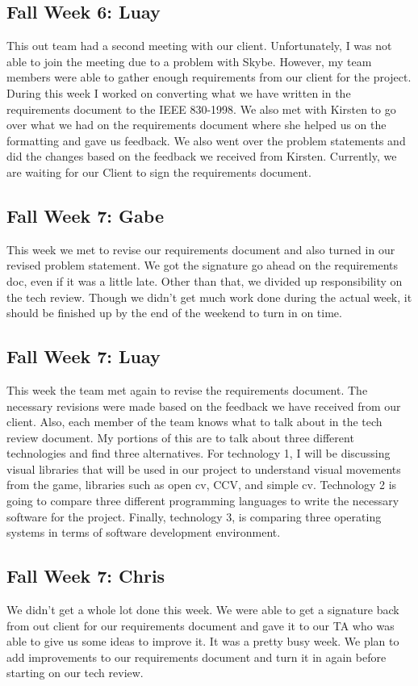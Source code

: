 \documentclass[onecolumn, draftclsnofoot,10pt, compsoc]{IEEEtran}
\begin{document}
\subsection{Fall Week 6: Luay}
This out team had a second meeting with our client. Unfortunately, I was not able to join the meeting due to a problem with Skybe. However, my team members were able to gather enough requirements from our client for the project. During this week I worked on converting what we have written in the requirements document to the IEEE 830-1998. We also met with Kirsten to go over what we had on the requirements document where she helped us on the formatting and gave us feedback. We also went over the problem statements and did the changes based on the feedback we received from Kirsten. Currently, we are waiting for our Client to sign the requirements document.
\subsection{Fall Week 7: Gabe}
This week we met to revise our requirements document and also turned in our revised problem statement. We got the signature go ahead on the requirements doc, even if it was a little late. Other than that, we divided up responsibility on the tech review. Though we didn't get much work done during the actual week, it should be finished up by the end of the weekend to turn in on time.
\subsection{Fall Week 7: Luay}
This week the team met again to revise the requirements document. The necessary revisions were made based on the feedback we have received from our client. Also, each member of the team knows what to talk about in the tech review document. My portions of this are to talk about three different technologies and find three alternatives. For technology 1, I will be discussing visual libraries that will be used in our project to understand visual movements from the game, libraries such as open cv, CCV, and simple cv. Technology 2 is going to compare three different programming languages to write the necessary software for the project. Finally, technology 3, is comparing three operating systems in terms of software development environment.
\subsection{Fall Week 7: Chris}
We didn't get a whole lot done this week. We were able to get a signature back from out client for our requirements document and gave it to our TA who was able to give us some ideas to improve it. It was a pretty busy week. We plan to add improvements to our requirements document and turn it in again before starting on our tech review.
\end{document}
